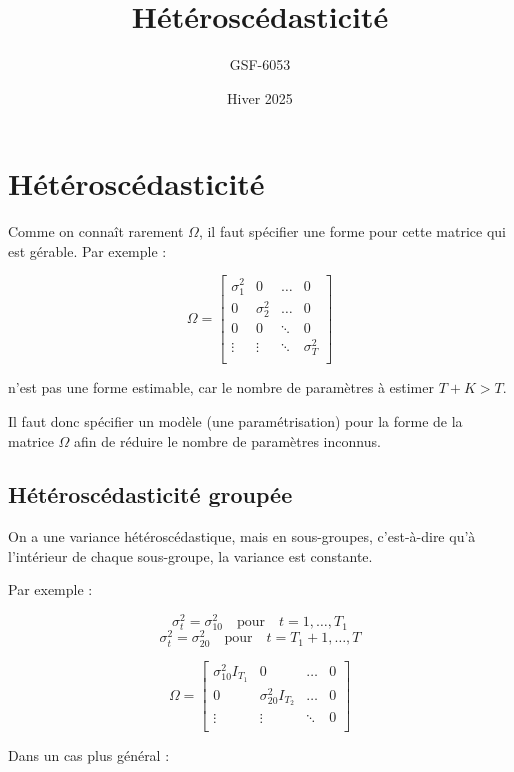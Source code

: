 \documentclass[14pt]{extarticle} %
\title{\textbf{Hétéroscédasticité}}
\author{GSF-6053}
\date{Hiver 2025}
\theoremstyle{definition}
\theoremstyle{plain}
\begin{document}
\maketitle

\tableofcontents

\newpage

\section{Hétéroscédasticité}
\textbf{\textcolor{blue}{\cite{wooldridge2010}}}

Comme on connaît rarement $\Omega$, il faut spécifier une forme pour cette matrice qui est gérable. Par exemple :

\[
\Omega = \begin{bmatrix}
\sigma_1^2 & 0 & \dots & 0 \\
0 & \sigma_2^2 & \dots & 0 \\
0 & 0 & \ddots & 0 \\
\vdots & \vdots & \ddots & \sigma_T^2 \\
\end{bmatrix}
\]

n'est pas une forme estimable, car le nombre de paramètres à estimer $T + K > T$.

Il faut donc spécifier un modèle (une paramétrisation) pour la forme de la matrice $\Omega$ afin de réduire le nombre de paramètres inconnus.

\subsection{Hétéroscédasticité groupée}
On a une variance hétéroscédastique, mais en sous-groupes, c'est-à-dire qu’à l’intérieur de chaque sous-groupe, la variance est constante.

Par exemple :

\[
\sigma_t^2 = \sigma_{10}^2 \quad \text{pour} \quad t = 1, \dots, T_1
\]
\[
\sigma_t^2 = \sigma_{20}^2 \quad \text{pour} \quad t = T_1+1, \dots, T
\]

\[
\Omega =
\begin{bmatrix}
\sigma_{10}^2 I_{T_1} & 0 & \dots & 0 \\
0 & \sigma_{20}^2 I_{T_2} & \dots & 0 \\
\vdots & \vdots & \ddots & 0 \\
\end{bmatrix}
\]

Dans un cas plus général :
\end{document}
